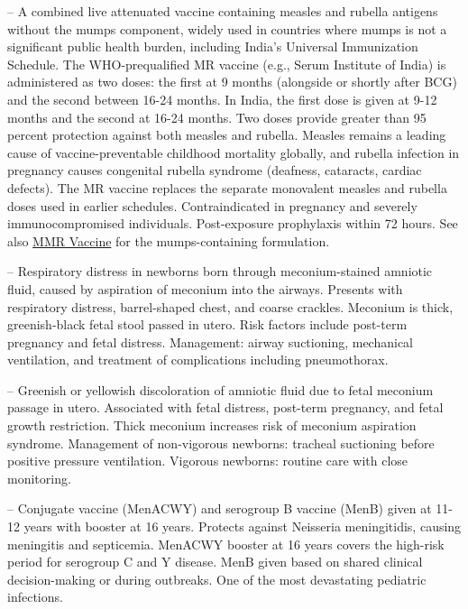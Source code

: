 -- A combined live attenuated vaccine containing measles and rubella antigens without the mumps component, widely used in countries where mumps is not a significant public health burden, including India's Universal Immunization Schedule. The WHO-prequalified MR vaccine (e.g., Serum Institute of India) is administered as two doses: the first at 9 months (alongside or shortly after BCG) and the second between 16-24 months. In India, the first dose is given at 9-12 months and the second at 16-24 months. Two doses provide greater than 95 percent protection against both measles and rubella. Measles remains a leading cause of vaccine-preventable childhood mortality globally, and rubella infection in pregnancy causes congenital rubella syndrome (deafness, cataracts, cardiac defects). The MR vaccine replaces the separate monovalent measles and rubella doses used in earlier schedules. Contraindicated in pregnancy and severely immunocompromised individuals. Post-exposure prophylaxis within 72 hours. See also \hyperlink{MMR Vaccine}{MMR Vaccine} for the mumps-containing formulation.

-- Respiratory distress in newborns born through meconium-stained amniotic fluid, caused by aspiration of meconium into the airways. Presents with respiratory distress, barrel-shaped chest, and coarse crackles. Meconium is thick, greenish-black fetal stool passed in utero. Risk factors include post-term pregnancy and fetal distress. Management: airway suctioning, mechanical ventilation, and treatment of complications including pneumothorax.

-- Greenish or yellowish discoloration of amniotic fluid due to fetal meconium passage in utero. Associated with fetal distress, post-term pregnancy, and fetal growth restriction. Thick meconium increases risk of meconium aspiration syndrome. Management of non-vigorous newborns: tracheal suctioning before positive pressure ventilation. Vigorous newborns: routine care with close monitoring.

-- Conjugate vaccine (MenACWY) and serogroup B vaccine (MenB) given at 11-12 years with booster at 16 years. Protects against Neisseria meningitidis, causing meningitis and septicemia. MenACWY booster at 16 years covers the high-risk period for serogroup C and Y disease. MenB given based on shared clinical decision-making or during outbreaks. One of the most devastating pediatric infections.

